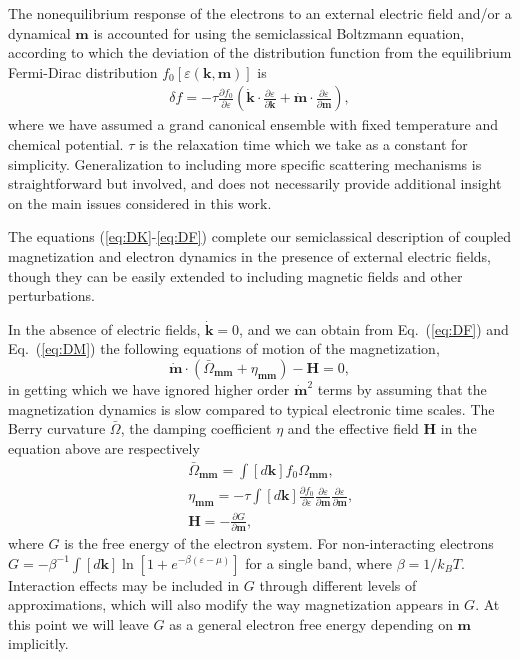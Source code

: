 \documentclass[aps,prb,twocolumn,showpacs,superscriptaddress]{revtex4-1}
\def\be{\begin{equation}} \def\ee{\end{equation}}
\def\bea{\begin{eqnarray}} \def\eea{\end{eqnarray}}
\def\fracp#1#2{\frac{\partial #1}{\partial #2}}
\begin{document}
The nonequilibrium response of the electrons to an external electric field and/or a dynamical $\bm m$ is accounted for using the semiclassical Boltzmann equation, according to which the deviation of the distribution function from the equilibrium Fermi-Dirac distribution $f_0[\varepsilon(\bm{k},\bm{m})]$ is
\bea
\delta f  
= - \tau \fracp{f_0}{\varepsilon}\left (\dot{\bm{k}} \cdot \fracp{\varepsilon}{\bm{k}} + \dot {\bm{m}} \cdot \fracp{\varepsilon}{\bm{m}} \right),  \label{eq:DF}
\eea
where we have assumed a grand canonical ensemble with fixed temperature and chemical potential. $\tau$ is the relaxation time which we take as a constant for simplicity. Generalization to including more specific scattering mechanisms is straightforward but involved, and does not necessarily provide additional insight on the main issues considered in this work. 

The equations (\ref{eq:DK}-\ref{eq:DF}) complete our semiclassical description of coupled magnetization and electron dynamics in the presence of external electric fields, though they can be easily extended to including magnetic fields and other perturbations. 

In the absence of electric fields, $\dot{\bm k} = 0$, and we can obtain from Eq.~(\ref{eq:DF}) and Eq.~(\ref{eq:DM}) the following equations of motion of the magnetization,
\be
\dot{\bm{m}}\cdot (\bar \Omega_{\bm{m}\bm{m}}+\eta_{\bm{m}\bm{m}}) - \bm{H}  = 0, \label{eq:memo}
\ee  
in getting which we have ignored higher order $\dot{\bm{m}}^2$ terms by assuming that the magnetization dynamics is slow compared to typical electronic time scales. The Berry curvature $\bar \Omega$, the damping coefficient $\eta$ and the effective field $\bm{H}$ in the equation above are respectively
\bea
&&\bar \Omega_{\bm{m}\bm{m}} = \int [d\bm{k}] f_0 \Omega_{\bm{m}\bm{m}},  \\
&&\eta_{\bm{m}\bm{m}} =  -\tau \int [d\bm{k}] \fracp{f_0}{\varepsilon} \fracp{\varepsilon}{\bm{m}} \fracp{\varepsilon}{\bm{m}}, \label{eq:FF}  \\
&&\bm{H} = -\fracp{G}{\bm{m}}, \label{eq:SE}
\eea
where $G$ is the free energy of the electron system. For non-interacting electrons $G = -{\beta}^{-1} \int [d\bm{k}] \ln[1+e^{-\beta(\varepsilon-\mu)}]$ for a single band, where $\beta = 1/k_B T$. Interaction effects may be included in $G$ through different levels of approximations, which will also modify the way magnetization appears in $G$. At this point we will leave $G$ as a general electron free energy depending on $\bm m$ implicitly.
\end{document}
